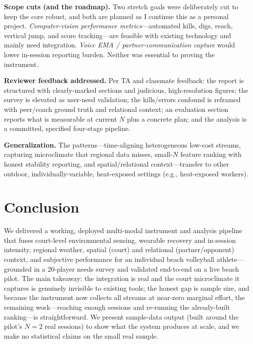 \documentclass[sigconf,nonacm]{acmart}
\begin{document}
\textbf{Scope cuts (and the roadmap).} Two stretch goals were deliberately cut to keep the core robust, and both are planned as I continue this as a personal project. \emph{Computer-vision performance metrics}---automated kills, digs, reach, vertical jump, and score tracking---are feasible with existing technology and mainly need integration. \emph{Voice EMA / partner-communication capture} would lower in-session reporting burden. Neither was essential to proving the instrument.

\textbf{Reviewer feedback addressed.} Per TA and classmate feedback: the report is structured with clearly-marked sections and judicious, high-resolution figures; the survey is elevated as user-need validation; the kills/errors confound is reframed with peer/coach ground truth and relational context; an evaluation section reports what is measurable at current $N$ plus a concrete plan; and the analysis is a committed, specified four-stage pipeline.

\textbf{Generalization.} The patterns---time-aligning heterogeneous low-cost streams, capturing microclimate that regional data misses, small-$N$ feature ranking with honest stability reporting, and spatial/relational context---transfer to other outdoor, individually-variable, heat-exposed settings (e.g., heat-exposed workers).

\section{Conclusion}
We delivered a working, deployed multi-modal instrument and analysis pipeline that fuses court-level environmental sensing, wearable recovery and in-session intensity, regional weather, spatial (court) and relational (partner/opponent) context, and subjective performance for an individual beach volleyball athlete---grounded in a 20-player needs survey and validated end-to-end on a live beach pilot. The main takeaway: the integration is real and the court microclimate it captures is genuinely invisible to existing tools; the honest gap is sample size, and because the instrument now collects all streams at near-zero marginal effort, the remaining work---reaching enough sessions and re-running the already-built ranking---is straightforward. We present sample-data output (built around the pilot's $N{=}2$ real sessions) to show what the system produces at scale, and we make no statistical claims on the small real sample.
\end{document}
